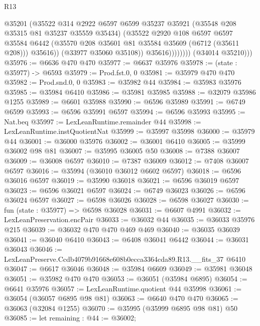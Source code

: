 \begin{lexlean}{R13}
\begin{coremodule}
                          @35201
                          (@35522
                            @314
                            @2922
                            @6597
                            @6599
                            @35237
                            @35921
                            (@35548 @208 @35315 @81 @35237 @35559 @35434)
                            (@35522
                              @2920
                              @108
                              @6597
                              @6597
                              @35584
                              @6442
                              (@35570 @208 @35601 @81 @35584 @35609 (@6712 (@35611 @208)))
                              @35616))
                          (@33977 @35060 @35108))
                        @35616))))))))
        (@34014 @35210)))
@35976 := @6636 @470 @470
@35977 := @6637 @35976
@35978 := (state : @35977) -> @6593
@35979 := Prod.fst.{0, 0}
@35981 := @35979 @470 @470
@35982 := Prod.snd.{0, 0}
@35983 := @35982 @44
@35984 := @35983 @35976
@35985 := @35984 @6410
@35986 := @35981 @35985
@35988 := @32079 @35986 @1255
@35989 := @6601 @35988
@35990 := @6596 @35989
@35991 := @6749 @6599
@35993 := @6596 @35991 @6597
@35994 := @6596 @35993
@35995 := Nat.beq
@35997 := LexLeanRuntime.remainder @44
@35998 := LexLeanRuntime.instQuotientNat
@35999 := @35997 @35998
@36000 := @35979 @44
@36001 := @36000 @35976
@36002 := @36001 @6410
@36005 := @35999 @36002 @98 @81
@36007 := @35995 @36005 @50
@36008 := @7388 @36007
@36009 := @36008 @6597
@36010 := @7387 @36009
@36012 := @7408 @36007 @6597
@36016 := @35994 (@36010 @36012 @6602 @6597)
@36018 := @6596 @36016 @6597
@36019 := @35990 @36018
@36021 := @6596 @36019 @6597
@36023 := @6596 @36021 @6597
@36024 := @6749 @36023
@36026 := @6596 @36024 @6597
@36027 := @6598 @36026
@36028 := @6598 @36027
@36030 := fun (state : @35977) => @6598 @36028
@36031 := @6607 @4991
@36032 := LexLeanPreservation.encPair
@36033 := @36032 @44
@36035 := @36033 @35976 @215
@36039 := @36032 @470 @470 @469 @469
@36040 := @36035 @36039
@36041 := @36040 @6410
@36043 := @6408 @36041 @6442
@36044 := @36031 @36043
@36046 := LexLeanPreserve.Ccdb4079b91668e608b0ecca3364cda89.R13.__fits_37 @6410
@36047 := @6617 @36046
@36048 := @35984 @6609
@36049 := @35981 @36048
@36051 := @35982 @470 @470
@36053 := @36051 (@35984 @6895)
@36054 := @6641 @35976
@36057 := LexLeanRuntime.quotient @44 @35998
@36061 := @36054 (@36057 @6895 @98 @81)
@36063 := @6640 @470 @470
@36065 := @36063 (@32084 @1255)
@36070 := @35995 (@35999 @6895 @98 @81) @50
@36085 := let remaining : @44 := @36002;

\end{coremodule}
\end{lexlean}
